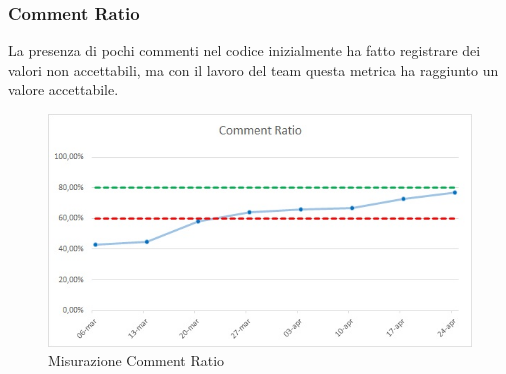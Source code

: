 \subsubsection{Comment Ratio}
La presenza di pochi commenti nel codice inizialmente ha fatto registrare dei valori non accettabili, ma con il lavoro del team questa metrica ha raggiunto un valore accettabile.
\begin{figure} [H]
	\centering
	\includegraphics[scale=1]{Img/CR}
	\caption{Misurazione Comment Ratio}\label{}
\end{figure}
\newpage


